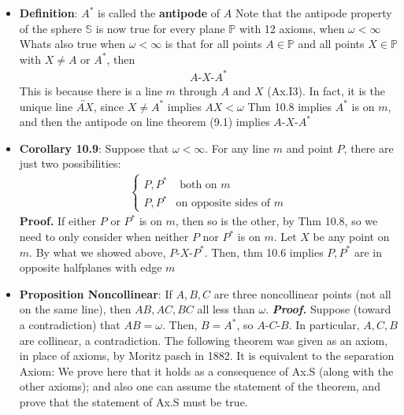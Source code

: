 \documentclass{report}
\begin{document}
\begin{itemize}
        \item \textbf{Definition}: $A^{*} $ is called the \textbf{antipode} of $A$
            \bigbreak \noindent 
            Note that the antipode property of the sphere $\mathbb{S}$ is now true for every plane $\mathbb{P}$ with 12 axioms, when $\omega < \infty$
            \bigbreak \noindent 
            Whats also true when $\omega < \infty$ is that for all points $A\in \mathbb{P}$ and all points $X \in \mathbb{P}$ with $X \ne A$ or $A^{*}$, then
            \begin{align*}
                A\text{-}X\text{-}A^{*}
            \end{align*}
            \bigbreak \noindent 
            This is because there is a line $m$ through $A$ and $X$ (Ax.I3). In fact, it is the unique line $\overleftrightarrow{AX}$, since $X \ne A^{*}$ implies $AX < \omega $
            \bigbreak \noindent 
            Thm 10.8 implies $A^{*}$ is on $m$, and then the antipode on line theorem (9.1) implies $ A\text{-}X\text{-}A^{*} $
        \item \textbf{Corollary 10.9}: Suppose that $\omega < \infty$. For any line $m$ and point $P$, there are just two possibilities:
            \begin{align*}
               \begin{cases}
                   P,P^{*} &\text{ both on $m$}     \\
                   P, P^{*} &\text{on opposite sides of $m$}
               \end{cases}
            \end{align*}
            \bigbreak \noindent 
            \textbf{Proof.} If either $P$ or $P^{*}$ is on $m$, then so is the other, by Thm 10.8, so we need to only consider when neither $P$ nor $P^{*}$ is on $m$. Let $X$ be any point on $m$. By what we showed above, $ P\text{-}X\text{-}P^{*}$. Then, thm 10.6 implies $P,P^{*}$ are in opposite halfplanes with edge $m$
        \item \textbf{Proposition Noncollinear}: If $A,B,C$ are three noncollinear points (not all on the same line), then $AB, AC,BC$ all less than $\omega$.
            \bigbreak \noindent 
            \textbf{\textit{Proof.}} Suppose (toward a contradiction) that $AB = \omega$. Then, $B = A^{*}$, so $ A\text{-}C\text{-}B$. In particular, $A,C,B$ are collinear, a contradiction.
            \bigbreak \noindent 
            The following theorem was given as an axiom, in place of axioms, by Moritz pasch in 1882. It is equivalent to the separation Axiom: We prove here that it holds as a consequence of Ax.S (along with the other axioms); and also one can assume the statement of the theorem, and prove that the statement of Ax.S must be true.

\end{itemize}
\end{document}
